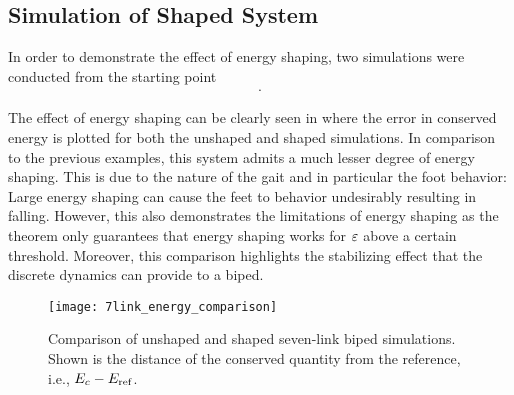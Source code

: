 \subsection{Simulation of Shaped System}


In order to demonstrate the effect of energy shaping, two simulations were conducted
from the starting point
\begin{align*}
  .
\end{align*}
%

%
The effect of energy shaping can be clearly seen in
 where the error in conserved energy is
plotted for both the unshaped and shaped simulations.
%
In comparison to the previous examples, this system admits a much lesser degree
of energy shaping.
%
This is due to the nature of the gait and in particular the foot behavior:
%
Large energy shaping can cause the feet to behavior undesirably resulting in
falling.
%
However, this also demonstrates the limitations of energy shaping as the theorem
only guarantees that energy shaping works for $\varepsilon$ above a certain
threshold.
%
Moreover, this comparison highlights the stabilizing effect that the discrete
dynamics can provide to a biped.

\begin{figure}[t!]
  \centering
  \texttt{[image: 7link\_energy\_comparison]}
  \caption[Comparison of shaped and unshaped seven-link biped
  simulations.]{Comparison of unshaped and shaped seven-link biped
    simulations.
    Shown is the distance of the conserved quantity from the reference, i.e.,
    $E_{c} - E_{\mathrm{ref}}$.}
  \label{fig:7link_energy_comparison}
\end{figure}
